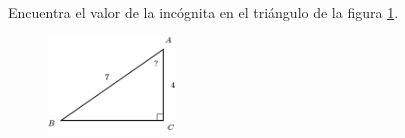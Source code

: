 Encuentra el valor de la incógnita en el triángulo de la figura \ref{fig:angle_functrig_18}.
\begin{figure}[H]
    \begin{center}
        \includegraphics[width=0.3\textwidth]{../images/angle_functrig_18.png}
    \end{center}
    \caption{}
    \label{fig:angle_functrig_18}
\end{figure}
